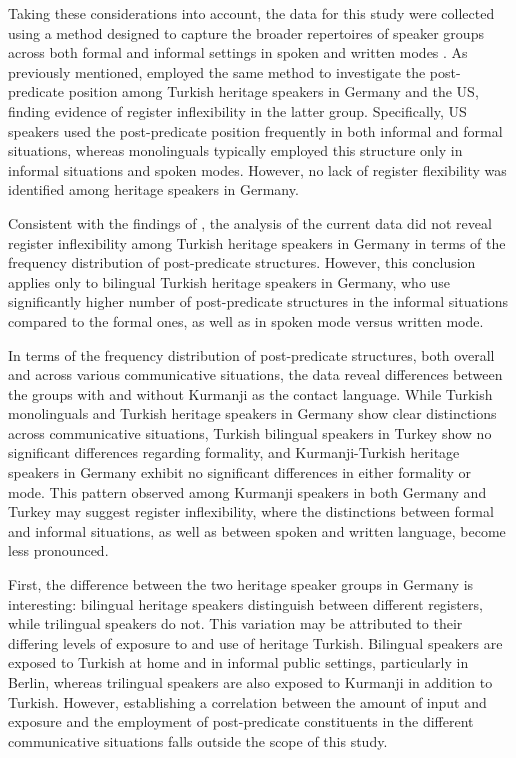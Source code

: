 Taking these considerations into account, the data for this study were collected using a method designed to capture the broader repertoires of speaker groups across both formal and informal settings in spoken and written modes \citep{Wiese2020}. As previously mentioned, \citet{SchroederEtAl2024} employed the same method to investigate the post-predicate position among Turkish heritage speakers in Germany and the US, finding evidence of register inflexibility in the latter group. Specifically, US speakers used the post-predicate position frequently in both informal and formal situations, whereas monolinguals typically employed this structure only in informal situations and spoken modes. However, no lack of register flexibility was identified among heritage speakers in Germany.

Consistent with the findings of \citet{SchroederEtAl2024}, the analysis of the current data did not reveal register inflexibility among Turkish heritage speakers in Germany in terms of the frequency distribution of post-predicate structures. However, this conclusion applies only to bilingual Turkish heritage speakers in Germany, who use significantly higher number of post-predicate structures in the informal situations compared to the formal ones, as well as in spoken mode versus written mode.

In terms of the frequency distribution of post-predicate structures, both overall and across various communicative situations, the data reveal differences between the groups with and without Kurmanji as the contact language. While Turkish monolinguals and Turkish heritage speakers in Germany show clear distinctions across communicative situations, Turkish bilingual speakers in Turkey show no significant differences regarding formality, and Kurmanji-Turkish heritage speakers in Germany exhibit no significant differences in either formality or mode. This pattern observed among Kurmanji speakers in both Germany and Turkey may suggest register inflexibility, where the distinctions between formal and informal situations, as well as between spoken and written language, become less pronounced.

First, the difference between the two heritage speaker groups in Germany is interesting: bilingual heritage speakers distinguish between different registers, while trilingual speakers do not. This variation may be attributed to their differing levels of exposure to and use of heritage Turkish. Bilingual speakers are exposed to Turkish at home and in informal public settings, particularly in Berlin, whereas trilingual speakers are also exposed to Kurmanji in addition to Turkish. However, establishing a correlation between the amount of input and exposure and the employment of post-predicate constituents in the different communicative situations falls outside the scope of this study.

